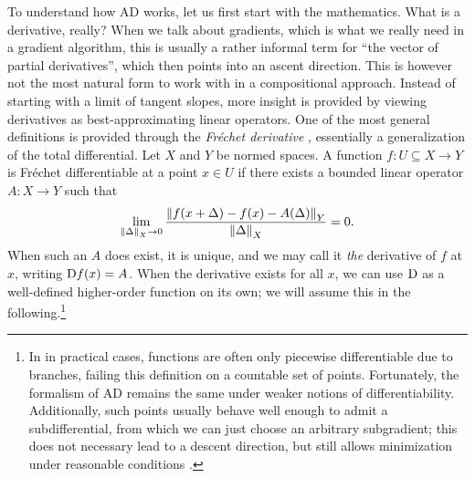 To understand how AD works, let us first start with the mathematics.  What is a derivative, really?
When we talk about gradients, which is what we really need in a gradient algorithm, this is usually
a rather informal term for \enquote{the vector of partial derivatives}, which then points into an
ascent direction.  This is however not the most natural form to work with in a compositional
approach.  Instead of starting with a limit of tangent slopes, more insight is provided by viewing
derivatives as best-approximating linear operators.  One of the most general definitions is provided
through the \emph{Fréchet derivative} \parencite[p. 463]{bronstein1995taschenbuch}, essentially a
generalization of the total differential.  Let \(X\) and \(Y\) be normed spaces.  A function
\(f: U \subseteq X \to Y\) is Fréchet differentiable at a point \(x \in U\) if there exists a
bounded linear operator \(A: X \to Y\) such that
\begin{equation}
  \label{eq:frechet}
  \lim_{\left\lVert\Delta\right\rVert_X \to 0} \frac{\left\lVert f(x + \Delta) - f(x) -
      A(\Delta)\right\rVert_Y}{\left\lVert\Delta\right\rVert_X} = 0.
\end{equation}
When such an \(A\) does exist, it is unique, and we may call it \emph{the} derivative of \(f\) at
\(x\), writing \(\mathop{}\!\mathrm{D} f(x) = A\).  When the derivative exists for all \(x\), we can use \(\mathop{}\!\mathrm{D}\) as
a well-defined higher-order function on its own; we will assume this in the following.\footnote{In
  in practical cases, functions are often only piecewise differentiable due to branches, failing
  this definition on a countable set of points.  Fortunately, the formalism of AD remains the same
  under weaker notions of differentiability.  Additionally, such points usually behave well enough
  to admit a subdifferential, from which we can just choose an arbitrary subgradient; this does not
  necessary lead to a descent direction, but still allows minimization under reasonable conditions
  \parencites[see][section 6.1]{pock2017convex}[][chapter 14]{griewank2008evaluating}.}

